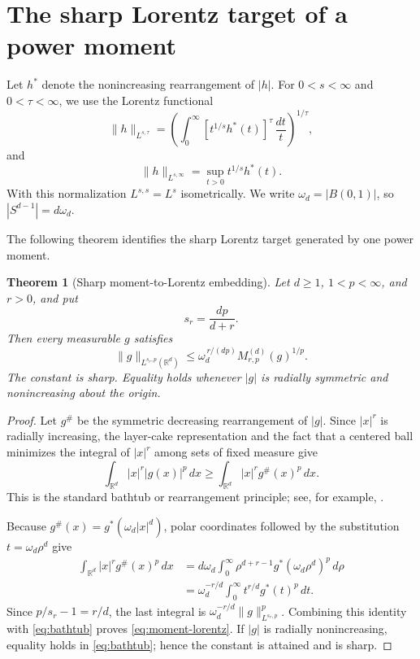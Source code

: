 \documentclass[11pt]{amsart}
\newtheorem{theorem}{Theorem}[section]
\theoremstyle{remark}
\newcommand{\R}{\mathbb R}
\newcommand{\norm}[1]{\lVert #1\rVert}
\newcommand{\Mrp}{M_{r,p}^{(d)}}
\begin{document}
\section{The sharp Lorentz target of a power moment}\label{sec:lorentz}

Let $h^*$ denote the nonincreasing rearrangement of $|h|$.  For
$0<s<\infty$ and $0<\tau<\infty$, we use the Lorentz functional
\begin{equation}\label{eq:lorentz}
 \norm{h}_{L^{s,\tau}}
 =\left(\int_0^\infty
 [t^{1/s}h^*(t)]^\tau\,\frac{dt}{t}\right)^{1/\tau},
\end{equation}
and
\[
 \norm{h}_{L^{s,\infty}}=\sup_{t>0}t^{1/s}h^*(t).
\]
With this normalization $L^{s,s}=L^s$ isometrically.  We write
$\omega_d=|B(0,1)|$, so $|S^{d-1}|=d\omega_d$.

The following theorem identifies the sharp Lorentz target generated by
one power moment.

\begin{theorem}[Sharp moment-to-Lorentz embedding]\label{thm:moment-lorentz}
Let $d\ge1$, $1<p<\infty$, and $r>0$, and put
\begin{equation}\label{eq:sr}
 s_r=\frac{dp}{d+r}.
\end{equation}
Then every measurable $g$ satisfies
\begin{equation}\label{eq:moment-lorentz}
 \norm{g}_{L^{s_r,p}(\R^d)}
 \le \omega_d^{\,r/(dp)}\Mrp(g)^{1/p}.
\end{equation}
The constant is sharp.  Equality holds whenever $|g|$ is radially
symmetric and nonincreasing about the origin.
\end{theorem}

\begin{proof}
Let $g^\#$ be the symmetric decreasing rearrangement of $|g|$.  Since
$|x|^r$ is radially increasing, the layer-cake representation and the fact
that a centered ball minimizes the integral of $|x|^r$ among sets of fixed
measure give
\begin{equation}\label{eq:bathtub}
 \int_{\R^d}|x|^r|g(x)|^p\,dx
 \ge \int_{\R^d}|x|^r g^\#(x)^p\,dx.
\end{equation}
This is the standard bathtub or rearrangement principle; see, for example,
\cite{LiebLoss}.

Because $g^\#(x)=g^*(\omega_d|x|^d)$, polar coordinates followed by the
substitution $t=\omega_d\rho^d$ give
\begin{align*}
 \int_{\R^d}|x|^r g^\#(x)^p\,dx
 &=d\omega_d\int_0^\infty
   \rho^{d+r-1}g^*(\omega_d\rho^d)^p\,d\rho\\
 &=\omega_d^{-r/d}\int_0^\infty t^{r/d}g^*(t)^p\,dt.
\end{align*}
Since $p/s_r-1=r/d$, the last integral is
$\omega_d^{-r/d}\norm{g}_{L^{s_r,p}}^p$.  Combining this identity with
\eqref{eq:bathtub} proves \eqref{eq:moment-lorentz}.  If $|g|$ is radially
nonincreasing, equality holds in \eqref{eq:bathtub}; hence the constant is
attained and is sharp.
\end{proof}
\end{document}

